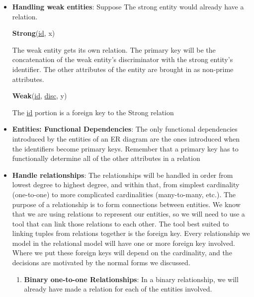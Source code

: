 \documentclass{report}
\begin{document}
\begin{itemize}
        \item \textbf{Handling weak entities}:  Suppose
            \bigbreak \noindent 
            \bigbreak \noindent 
            The strong entity would already have a relation. 
            \begin{center}
                \textbf{Strong}(\underline{id}, x)
            \end{center}
            \bigbreak \noindent 
            The weak entity gets its own relation. The primary key will be the concatenation of the weak entity's discriminator with the strong entity's identifier. The other attributes of the entity are brought in as non-prime attributes.
            \begin{center}
                \textbf{Weak}(\underline{id}\dag, \underline{disc}, y)
            \end{center}
            \bigbreak \noindent 
            The \underline{id} portion is a foreign key to the Strong relation
        \item \textbf{Entities: Functional Dependencies}: The only functional dependencies introduced by the entities of an ER diagram are the ones introduced when the identifiers become primary keys. Remember that a primary key has to functionally determine all of the other attributes in a relation
        \item \textbf{Handle relationships}: The relationships will be handled in order from lowest degree to highest degree, and within that, from simplest cardinality (one-to-one) to more complicated cardinalities (many-to-many, etc.).
            \bigbreak \noindent 
            The purpose of a relationship is to form connections between entities. We know that we are using relations to represent our entities, so we will need to use a tool that can link those relations to each other.
            \bigbreak \noindent 
            The tool best suited to linking tuples from relations together is the foreign key.
            \bigbreak \noindent 
            Every relationship we model in the relational model will have one or more foreign key involved. Where we put these foreign keys will depend on the cardinality, and the decisions are motivated by the normal forms we discussed.
            \begin{enumerate}
                \item \textbf{Binary one-to-one Relationships}: In a binary relationship, we will already have made a relation for each of the entities involved.
                    \bigbreak \noindent 

\end{enumerate}
\end{itemize}
\end{document}
